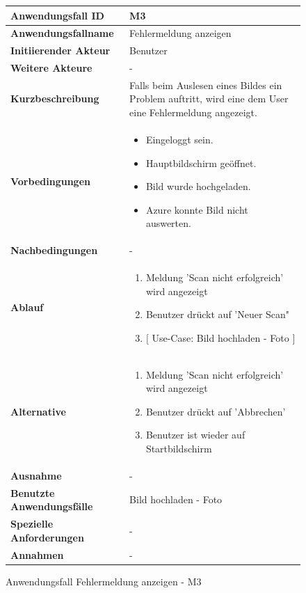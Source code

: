 \begin{figure}[h]
	\centering
	\begin{tabularx}{\textwidth}{ X | X }
		\textbf{Anwendungsfall ID} & M3 \\ \hline
		\textbf{Anwendungsfallname} & Fehlermeldung anzeigen \\ \hline
		\textbf{Initiierender Akteur} & Benutzer \\ \hline
		\textbf{Weitere Akteure} & - \\ \hline
		\textbf{Kurzbeschreibung} & Falls beim Auslesen eines Bildes ein Problem auftritt, wird eine dem User eine Fehlermeldung angezeigt.   \\ \hline
		\textbf{Vorbedingungen} & 
		\begin {itemize}
			\item Eingeloggt sein. 
			\item Hauptbildschirm geöffnet.
			\item Bild wurde hochgeladen.
			\item Azure konnte Bild nicht auswerten.
		\end{itemize}\\ \hline
		\textbf{Nachbedingungen} & - \\ \hline
		\textbf{Ablauf} &
		\begin{enumerate}
			\item Meldung 'Scan nicht erfolgreich' wird angezeigt
			\item Benutzer drückt auf 'Neuer Scan"
			\item $\lbrack$ Use-Case: Bild hochladen - Foto $\rbrack$
		\end{enumerate} \\ \hline
		\textbf{Alternative} & 
		\begin{enumerate}
			\item Meldung 'Scan nicht erfolgreich' wird angezeigt
			\item Benutzer drückt auf 'Abbrechen'
			\item Benutzer ist wieder auf Startbildschirm
		\end{enumerate} \\ \hline
		\textbf{Ausnahme} & -   \\ \hline
		\textbf{Benutzte Anwendungsfälle} & Bild hochladen - Foto \\ \hline
		\textbf{Spezielle Anforderungen} & - \\ \hline
		\textbf{Annahmen} & -
	\end{tabularx}
	\caption{Anwendungsfall Fehlermeldung anzeigen - M3}
	\label{fig:anwendungsfall-server-tabelle-xx-1}
\end{figure}

